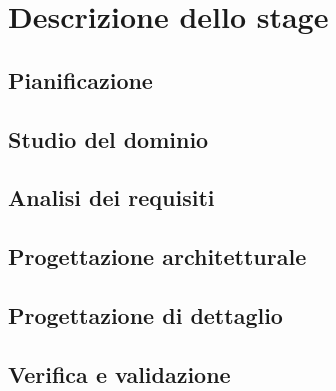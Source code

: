 
\chapter{Descrizione dello stage}
\label{cap:descrizione-stage}


\section{Pianificazione}

\section{Studio del dominio}

\section{Analisi dei requisiti}

\section{Progettazione architetturale}

\section{Progettazione di dettaglio}

\section{Verifica e validazione}